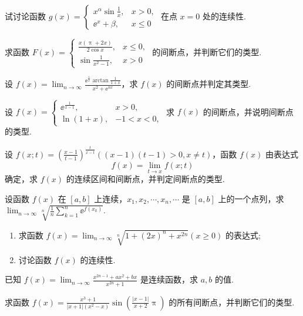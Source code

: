 	\begin{ti}
		试讨论函数 $g(x) = \begin{cases}
			x^{\alpha} \sin\frac{1}{x}, & x > 0,\\
			\ee^{x} + \beta, & x \leq 0
		\end{cases}$ 在点 $x = 0$ 处的连续性.
	\end{ti}

	\begin{ti}
		求函数 $F(x) = \begin{cases}
			\frac{x(\uppi + 2x)}{2 \cos x}, & x \leq 0,\\
			\sin\frac{1}{x^{2} - 1}, & x > 0
		\end{cases}$ 的间断点，并判断它们的类型.
	\end{ti}

	\begin{ti}
		设 $f(x) = \lim_{n \to \infty}\frac{\ee^{\frac{1}{x}} \arctan\frac{1}{1 + x}}{x^{2} + \ee^{nx}}$，求 $f(x)$ 的间断点并判定其类型.
	\end{ti}

	\begin{ti}
		设 $f(x) = \begin{cases}
			\ee^{\frac{1}{x - 1}}, & x > 0,\\
			\ln(1 + x), & -1 < x < 0,
		\end{cases}$ 求 $f(x)$ 的间断点，并说明间断点的类型.
	\end{ti}

	\begin{ti}
		设 $f(x;t) = \left( \frac{x - 1}{t - 1} \right)^{\frac{t}{x - t}}((x - 1)(t - 1)>0, x \ne t)$，函数 $f(x)$ 由表达式
		\[
			f(x) = \lim_{t \to x}f(x;t)
		\]
		确定，求 $f(x)$ 的连续区间和间断点，并判定间断点的类型.
	\end{ti}

	\begin{ti}
		设函数 $f(x)$ 在 $[a,b]$ 上连续，$x_{1},x_{2},\cdots,x_{n},\cdots$ 是 $[a,b]$ 上的一个点列，求 $\lim_{n \to \infty} \sqrt[n]{\frac{1}{n}\sum_{k=1}^{n}\ee^{f(x_{k})}}$.
	\end{ti}

	\begin{ti}
		\begin{enumerate}
			\item 求函数 $f(x) = \lim_{n \to \infty} \sqrt[n]{1 + (2x)^{n} + x^{2n}}(x \geq 0)$ 的表达式;
			\item 讨论函数 $f(x)$ 的连续性.
		\end{enumerate}
	\end{ti}

	\begin{ti}
		已知 $f(x) = \lim_{n \to \infty} \frac{x^{2n-1} + ax^{2} + bx}{x^{2n} + 1}$ 是连续函数，求 $a,b$ 的值.
	\end{ti}

	\begin{ti}
		求函数 $f(x) = \frac{x^{3} + 1}{|x + 1|\left( x^{2} - x \right)} \sin\left( \frac{|x - 1|}{x + 2}\uppi \right)$ 的所有间断点，并判断它们的类型.
	\end{ti}